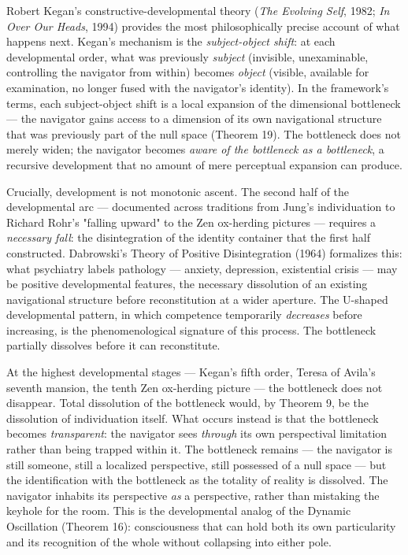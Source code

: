 Robert Kegan's constructive-developmental theory (\textit{The Evolving Self}, 1982; \textit{In Over Our Heads}, 1994) provides the most philosophically precise account of what happens next. Kegan's mechanism is the \textit{subject-object shift}: at each developmental order, what was previously \textit{subject} (invisible, unexaminable, controlling the navigator from within) becomes \textit{object} (visible, available for examination, no longer fused with the navigator's identity). In the framework's terms, each subject-object shift is a local expansion of the dimensional bottleneck — the navigator gains access to a dimension of its own navigational structure that was previously part of the null space (Theorem 19). The bottleneck does not merely widen; the navigator becomes \textit{aware of the bottleneck as a bottleneck}, a recursive development that no amount of mere perceptual expansion can produce.


Crucially, development is not monotonic ascent. The second half of the developmental arc — documented across traditions from Jung's individuation to Richard Rohr's "falling upward" to the Zen ox-herding pictures — requires a \textit{necessary fall}: the disintegration of the identity container that the first half constructed. Dabrowski's Theory of Positive Disintegration (1964) formalizes this: what psychiatry labels pathology — anxiety, depression, existential crisis — may be positive developmental features, the necessary dissolution of an existing navigational structure before reconstitution at a wider aperture. The U-shaped developmental pattern, in which competence temporarily \textit{decreases} before increasing, is the phenomenological signature of this process. The bottleneck partially dissolves before it can reconstitute.


At the highest developmental stages — Kegan's fifth order, Teresa of Avila's seventh mansion, the tenth Zen ox-herding picture — the bottleneck does not disappear. Total dissolution of the bottleneck would, by Theorem 9, be the dissolution of individuation itself. What occurs instead is that the bottleneck becomes \textit{transparent}: the navigator sees \textit{through} its own perspectival limitation rather than being trapped within it. The bottleneck remains — the navigator is still someone, still a localized perspective, still possessed of a null space — but the identification with the bottleneck as the totality of reality is dissolved. The navigator inhabits its perspective \textit{as} a perspective, rather than mistaking the keyhole for the room. This is the developmental analog of the Dynamic Oscillation (Theorem 16): consciousness that can hold both its own particularity and its recognition of the whole without collapsing into either pole.


